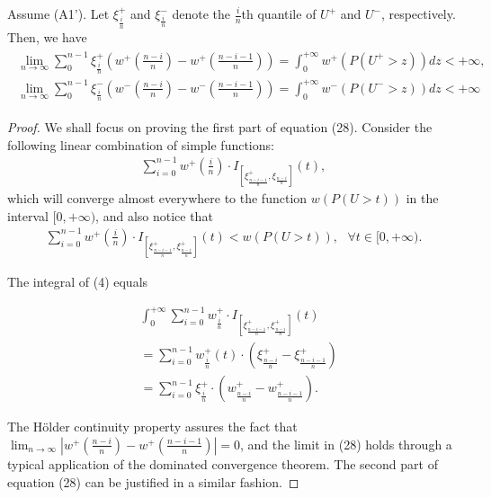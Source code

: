 \documentclass{article}
\numberwithin{equation}{section}
\numberwithin{theorem}{section}
\begin{document}
\begin{proposition}
\label{prop:holder-quantile}
Assume (A1'). Let $\xi^+_{\frac{i}{n}}$ and $\xi^-_{\frac{i}{n}}$ denote the $\frac{i}{n}$th quantile of $U^+$ and $U^-$, respectively. Then, we have 
\begin{align}
\label{eq:simple-estimation}
\begin{split}
\lim_{n \rightarrow \infty} \sum_0^{n-1} \xi^+_{\frac{i}{n}} (w^+(\frac{n-i}{n})- w^+(\frac{n-i-1}{n}) ) = \int_0^{+\infty} w^+(P(U^+>z)) dz < +\infty,
\\
\lim_{n \rightarrow \infty} \sum_0^{n-1} \xi^-_{\frac{i}{n}} (w^-(\frac{n-i}{n})- w^-(\frac{n-i-1}{n}) ) = \int_0^{+\infty} w^-(P(U^->z)) dz < +\infty
\end{split}
\end{align}
\end{proposition}

\begin{proof}
We shall focus on proving the first part of equation (28). Consider the following linear combination of simple functions: 
\begin{align}
\sum_{i=0}^{n-1} w^+ (\frac{i}{n}) 
\cdot I_{[\xi^+_\frac{n-i-1}{n}, \xi_\frac{n-i}{n}]}(t),
\end{align}
which will converge almost everywhere to the function $w(P(U>t))$ in the interval $[0, +\infty)$, and also notice that 
\begin{align}
\sum_{i=0}^{n-1} w^+ (\frac{i}{n}) 
\cdot I_{[\xi^+_\frac{n-i-1}{n}, \xi^+_\frac{n-i}{n}]}(t)
<
w(P(U>t)),
\text{         } \forall t \in [0,+\infty).
\end{align}

The integral of (4) equals  

\begin{align}
& \int_0^{+\infty} \sum_{i=0}^{n-1} w^+_{\frac{i}{n}} \cdot I_{[\xi^+_\frac{n-i-1}{n},
\xi^+_\frac{n-i}{n}]}(t) \\ & = \sum_{i=0}^{n-1} w^+_{\frac{i}{n}}(t) \cdot (\xi^+_{\frac{n-i}{n}} -
\xi^+_{\frac{n-i-1}{n}}) \\ & = \sum_{i=0}^{n-1} \xi^+_{\frac{i}{n}} \cdot (w^+_{\frac{n-i}{n}}-
    w^+_{\frac{n-i-1}{n}}).
\end{align}

The H\"{o}lder continuity property assures the fact that 
$\lim_{n \rightarrow \infty}  | w^+(\frac{n-i}{n})- w^+(\frac{n-i-1}{n})| =0$, and the limit in (28) holds through a typical application of the dominated convergence theorem.
The second part of equation (28) can be justified in a similar fashion.
\end{proof} 
\end{document}
